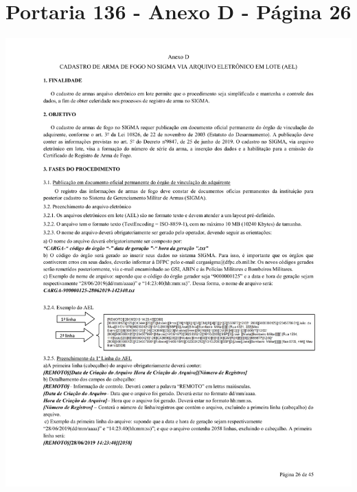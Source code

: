\chapter{Portaria 136 - Anexo D - Página 26}
\includegraphics[scale=0.7]{imagens/AnexoA1-AnexoD-portaria-136}

